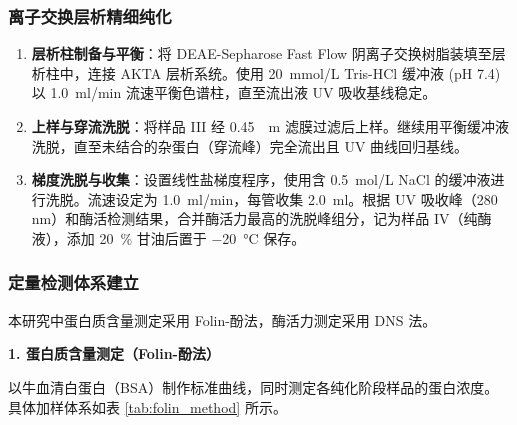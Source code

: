 \documentclass[10.5pt, a4paper]{ctexart}
\begin{document}
\subsubsection{离子交换层析精细纯化}

\begin{enumerate}
    \item \textbf{层析柱制备与平衡}：将 DEAE-Sepharose Fast Flow 阴离子交换树脂装填至层析柱中，连接 AKTA 层析系统。使用 \SI{20}{mmol/L} Tris-HCl 缓冲液 (pH 7.4) 以 \SI{1.0}{ml/min} 流速平衡色谱柱，直至流出液 UV 吸收基线稳定。
    \item \textbf{上样与穿流洗脱}：将样品 III 经 \SI{0.45}{\mu m} 滤膜过滤后上样。继续用平衡缓冲液洗脱，直至未结合的杂蛋白（穿流峰）完全流出且 UV 曲线回归基线。
    \item \textbf{梯度洗脱与收集}：设置线性盐梯度程序，使用含 \SI{0.5}{mol/L} NaCl 的缓冲液进行洗脱。流速设定为 \SI{1.0}{ml/min}，每管收集 \SI{2.0}{ml}。根据 UV 吸收峰（280 nm）和酶活检测结果，合并酶活力最高的洗脱峰组分，记为样品 IV（纯酶液），添加 \SI{20}{\%} 甘油后置于 \SI{-20}{\celsius} 保存。
\end{enumerate}

\subsubsection{定量检测体系建立}

本研究中蛋白质含量测定采用 Folin-酚法，酶活力测定采用 DNS 法。

\textbf{1. 蛋白质含量测定（Folin-酚法）}

以牛血清白蛋白（BSA）制作标准曲线，同时测定各纯化阶段样品的蛋白浓度。具体加样体系如表 \ref{tab:folin_method} 所示。

\begin{table}[H]
    \centering
    \caption{Folin-酚法测定蛋白含量加样表}
    \label{tab:folin_method}
\end{table}
\end{document}
